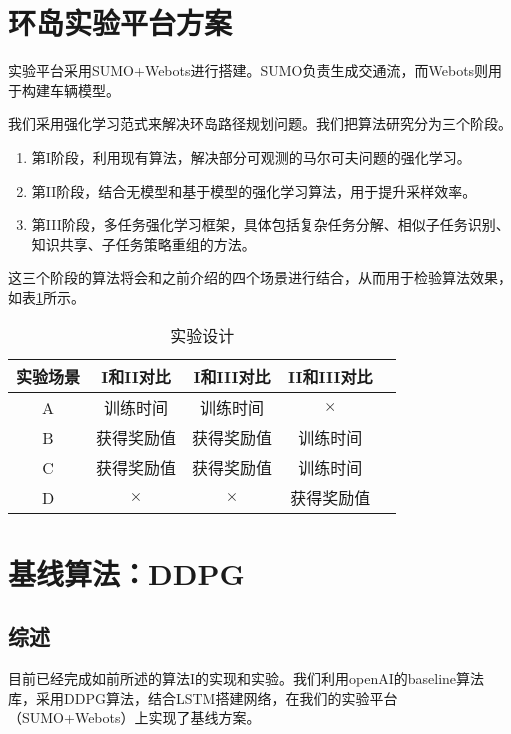 \section{环岛实验平台方案}
    实验平台采用SUMO\cite{SUMO}+Webots\cite{Webots}进行搭建。SUMO负责生成交通流，而Webots则用于构建车辆模型。\par
    我们采用强化学习范式来解决环岛路径规划问题。我们把算法研究分为三个阶段。
    \begin{enumerate}
      \item 第I阶段，利用现有算法，解决部分可观测的马尔可夫问题的强化学习。
      \item 第II阶段，结合无模型和基于模型的强化学习算法，用于提升采样效率。
      \item 第III阶段，多任务强化学习框架，具体包括复杂任务分解、相似子任务识别、知识共享、子任务策略重组的方法。
    \end{enumerate}
    \par 这三个阶段的算法将会和之前介绍的四个场景进行结合，从而用于检验算法效果，如表\ref{table:experiments}所示。
    \begin{table}[h!]
    \centering
    \caption{实验设计}
    \label{table:experiments}
    \begin{tabular}[c]{|c|c|c|c|c|}
    \hline
    \textbf{实验场景} & \textbf{I和II对比} & \textbf{I和III对比} & \textbf{II和III对比}\\
    \hline \hline
    A   & 训练时间 & 训练时间 & $\times$ \\ \hline
    B   & 获得奖励值 & 获得奖励值 & 训练时间 \\ \hline
    C   & 获得奖励值 & 获得奖励值 & 训练时间 \\ \hline
    D   & $\times$ & $\times$ & 获得奖励值 \\
    \hline
    \end{tabular}
    \end{table}

\section{基线算法：DDPG}
  \subsection{综述}
  目前已经完成如前所述的算法I的实现和实验。我们利用openAI的baseline算法库\cite{openAI_baselines}，采用DDPG\cite{DDPG}算法，结合LSTM\cite{DRQ}搭建网络，在我们的实验平台（SUMO+Webots）上实现了基线方案。\par
  
